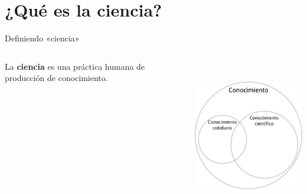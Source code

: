 \documentclass[%
            9pt,
                spanish, %
                    ignorenonframetext,
                    handout, %
                aspectratio=169, %
        ]{beamer}
\begin{document}
\section{¿Qué es la ciencia?}\label{quuxe9-es-la-ciencia}

\begin{frame}{Definiendo «ciencia»}
\protect{}\label{definiendo-ciencia}
\begin{columns}[c,onlytextwidth]
\begin{column}{0.48\linewidth}
La \textbf{ciencia} es una práctica humana de producción de
conocimiento.
\end{column}

\begin{column}{0.48\linewidth}
\begin{center}
\includegraphics[height=18em]{venn.pdf}
\end{center}
\end{column}
\end{columns}
\end{frame}
\end{document}
